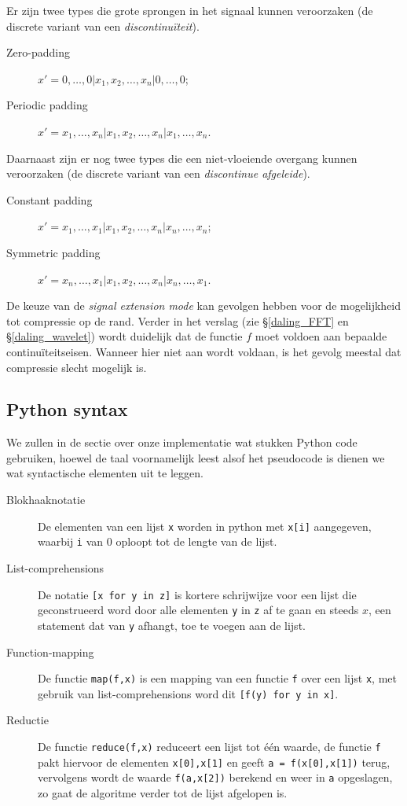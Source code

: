 Er zijn twee types die grote sprongen in het signaal kunnen veroorzaken (de discrete variant van een \emph{discontinu\"iteit}).
\begin{description}
\item[Zero-padding] $x' = 0, \ldots, 0| x_1, x_2, \ldots, x_n| 0, \ldots, 0$;
\item[Periodic padding] $x' = x_1, \ldots, x_n| x_1, x_2, \ldots, x_n| x_1, \ldots, x_n$.
\end{description}
Daarnaast zijn er nog twee types die een niet-vloeiende overgang kunnen veroorzaken (de discrete variant van een \emph{discontinue afgeleide}).
\begin{description}
\item[Constant padding] $x' = x_1, \ldots, x_1| x_1, x_2, \ldots, x_n| x_n, \ldots, x_n$;
\item[Symmetric padding] $x' = x_n, \ldots, x_1| x_1, x_2, \ldots, x_n| x_n, \ldots, x_1$.
\end{description}

De keuze van de \emph{signal extension mode} kan gevolgen hebben voor de mogelijkheid tot compressie op de rand. Verder in het verslag (zie \S \ref{daling_FFT} en \S \ref{daling_wavelet}) wordt duidelijk dat de functie $f$ moet voldoen aan bepaalde continu\"iteitseisen. Wanneer hier niet aan wordt voldaan, is het gevolg meestal dat compressie slecht mogelijk is.

\subsection{Python syntax}
We zullen in de sectie over onze implementatie wat stukken Python code gebruiken, hoewel de taal
voornamelijk leest alsof het pseudocode is dienen we wat syntactische elementen uit te leggen.
\begin{description}
\item[Blokhaaknotatie] De elementen van een lijst \texttt{x} worden in python met \texttt{x[i]} aangegeven,
  waarbij \texttt{i} van $0$ oploopt tot de lengte van de lijst.
\item[List-comprehensions] De notatie \texttt{[x for y in z]} is kortere schrijwijze voor een lijst die geconstrueerd
  word door alle elementen \texttt{y} in \texttt{z} af te gaan en steeds 
  $x$, een statement dat van \texttt{y} afhangt, toe te voegen aan de lijst.
\item[Function-mapping] De functie \texttt{map(f,x)} is een mapping van een functie \texttt{f} over een lijst 
  \texttt{x}, met gebruik van list-comprehensions word dit \texttt{[f(y) for y in x]}.
\item[Reductie] De functie \texttt{reduce(f,x)} reduceert een lijst tot \'e\'en waarde, de functie \texttt{f} pakt
  hiervoor de elementen \texttt{x[0],x[1]} en geeft \texttt{a = f(x[0],x[1])} terug, vervolgens wordt
  de waarde \texttt{f(a,x[2])} berekend en weer in \texttt{a} opgeslagen, zo gaat de algoritme verder tot de lijst
  afgelopen is.
\end{description}
